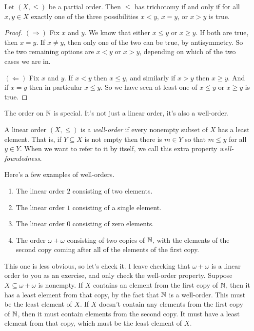 \documentclass[10pt]{amsart}
\begin{document}
\begin{proposition}
Let $(X,\le)$ be a partial order. Then $\le$ has trichotomy if and only if for all $x,y \in X$ exactly one of the three possibilities $x < y$, $x = y$, or $x > y$ is true.
\end{proposition}

\begin{proof}
$(\Rightarrow)$ Fix $x$ and $y$. We know that either $x \le y$ or $x \ge y$. If both are true, then $x = y$. If $x \ne y$, then only one of the two can be true, by antisymmetry. So the two remaining options are $x < y$ or $x > y$, depending on which of the two cases we are in.

$(\Leftarrow)$ Fix $x$ and $y$. If $x < y$ then $x \le y$, and similarly if $x > y$ then $x \ge y$. And if $x = y$ then in particular $x \le y$. So we have seen at least one of $x \le y$ or $x \ge y$ is true.
\end{proof}

The order on $\mathbb{N}$ is special. It's not just a linear order, it's also a well-order.

\begin{definition}
A linear order $(X,\le)$ is a \emph{well-order} if every nonempty subset of $X$ has a least element. That is, if $Y \subseteq X$ is not empty then there is $m \in Y$ so that $m \le y$ for all $y \in Y$. When we want to refer to it by itself, we call this extra property \emph{well-foundedness}.
\end{definition}

Here's a few examples of well-orders.

\begin{enumerate}
\item The linear order $2$ consisting of two elements. 
\item The linear order $1$ consisting of a single element.
\item The linear order $0$ consisting of zero elements.
\item The order $\omega + \omega$ consisting of two copies of $\mathbb{N}$, with the elements of the second copy coming after all of the elements of the first copy.
\end{enumerate}

This one is less obvious, so let's check it. I leave checking that $\omega + \omega$ is a linear order to you as an exercise, and only check the well-order property. Suppose $X \subseteq \omega + \omega$ is nonempty. If $X$ contains an element from the first copy of $\mathbb{N}$, then it has a least element from that copy, by the fact that $\mathbb{N}$ is a well-order. This must be the least element of $X$. If $X$ doesn't contain any elements from the first copy of $\mathbb{N}$, then it must contain elements from the second copy. It must have a least element from that copy, which must be the least element of $X$.
\end{document}
